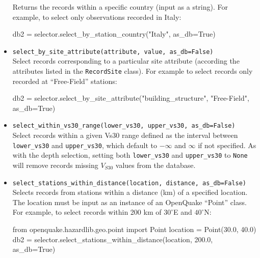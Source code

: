 \begin{itemize}
Returns the records within a specific country (input as a string). For example, to select only observations recorded in Italy:

\begin{python}
db2 = selector.select_by_station_country("Italy",
                                         as_db=True)
\end{python}

\item \verb;select_by_site_attribute(attribute, value, as_db=False);\\

Select records corresponding to a particular site attribute (according the attributes listed in the \verb=RecordSite= class). For example to select records only recorded at ``Free-Field'' stations:

\begin{python}
db2 = selector.select_by_site_attribute("building_structure", 
                                        "Free-Field",
                                        as_db=True)
\end{python}

\item \verb;select_within_vs30_range(lower_vs30, upper_vs30, as_db=False);\\

Select records within a given Vs30 range defined as the interval between \verb=lower_vs30= and \verb=upper_vs30=, which default to $-\infty$ and $\infty$ if not specified. As with the depth selection, setting both \verb=lower_vs30= and \verb=upper_vs30= to \verb=None= will remove records missing $V_{S30}$ values from the database. 

\item \verb;select_stations_within_distance(location, distance, as_db=False);\\

Selects records from stations within a distance (km) of a specified location. The location must be input as an instance of an OpenQuake ``Point'' class. For example, to select records within 200 km of $30^{\circ}$E and $40^{\circ}$N:

\begin{python}
from openquake.hazardlib.geo.point import Point
location = Point(30.0, 40.0)
db2 = selector.select_stations_within_distance(location,
                                               200.0,
                                               as_db=True)
\end{python}


\end{itemize}
